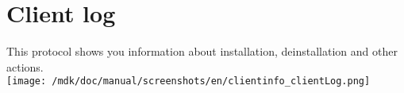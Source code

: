 \section{Client log}This protocol shows you information about installation, deinstallation and other actions.\\
\texttt{[image: /mdk/doc/manual/screenshots/en/clientinfo\_clientLog.png]} \\

